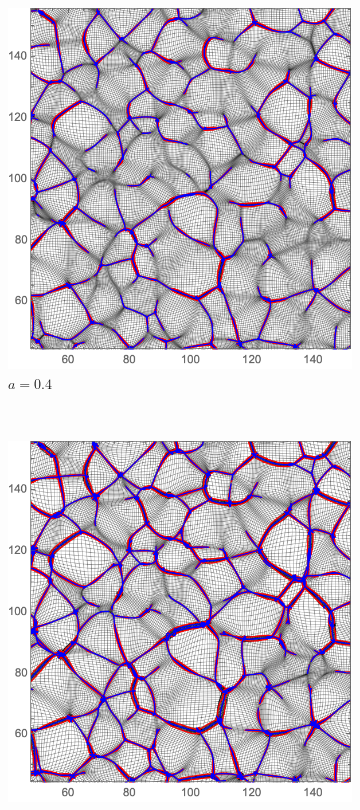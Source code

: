 \documentclass[a4paper, 11pt]{article}
\begin{document}
\begin{figure}
\begin{subfigure}[b]{0.49\textwidth}
\includegraphics[width=\textwidth]{Evolution_040}
\caption{$a=0.4$}
\end{subfigure}\\
\begin{subfigure}[b]{0.49\textwidth}
\includegraphics[width=\textwidth]{Evolution_060}

\end{subfigure}
\end{figure}
\end{document}
